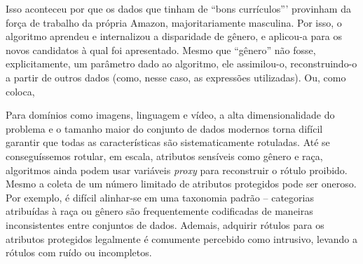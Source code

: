Isso aconteceu por que os dados que tinham de ``bons currículos''' provinham da força de trabalho da própria Amazon, majoritariamente masculina.
Por isso, o algoritmo aprendeu e internalizou a disparidade de gênero, e aplicou-a para os novos candidatos à qual foi apresentado.
Mesmo que ``gênero'' não fosse, explicitamente, um parâmetro dado ao algoritmo, ele assimilou-o, reconstruindo-o a partir de outros dados (como, nesse caso, as expressões utilizadas).
Ou, como \textcite[tradução~própria]{hooker_moving_2021} coloca,

\begin{citacao}
Para domínios como imagens, linguagem e vídeo, a alta dimensionalidade do problema e o tamanho maior do conjunto de dados modernos torna difícil garantir que todas as características são sistematicamente rotuladas.
Até se conseguíssemos rotular, em escala, atributos sensíveis como gênero e raça, algoritmos ainda podem usar variáveis \textit{proxy} para reconstruir o rótulo proibido.
Mesmo a coleta de um número limitado de atributos protegidos pode ser oneroso.
Por exemplo, é difícil alinhar-se em uma taxonomia padrão -- categorias atribuídas à raça ou gênero são frequentemente codificadas de maneiras inconsistentes entre conjuntos de dados.
Ademais, adquirir rótulos para os atributos protegidos legalmente é comumente percebido como intrusivo, levando a rótulos com ruído ou incompletos.
\end{citacao}


